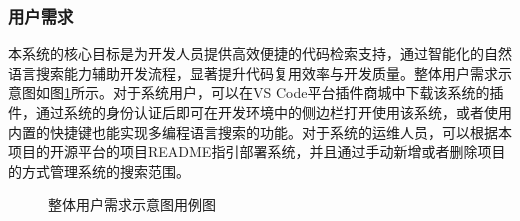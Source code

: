 \documentclass[UTF8,a4paper,12pt]{ctexart}
\numberwithin{equation}{section}
\begin{document}
\subsubsection{用户需求}
本系统的核心目标是为开发人员提供高效便捷的代码检索支持，通过智能化的自然语言搜索能力辅助开发流程，显著提升代码复用效率与开发质量。整体用户需求示意图如图\ref{flow}所示。对于系统用户，可以在VS Code平台插件商城中下载该系统的插件，通过系统的身份认证后即可在开发环境中的侧边栏打开使用该系统，或者使用内置的快捷键也能实现多编程语言搜索的功能。对于系统的运维人员，可以根据本项目的开源平台的项目README指引部署系统，并且通过手动新增或者删除项目的方式管理系统的搜索范围。
\begin{figure}[H]
	\caption{整体用户需求示意图用例图}
	\label{flow}
\end{figure}
\end{document}
